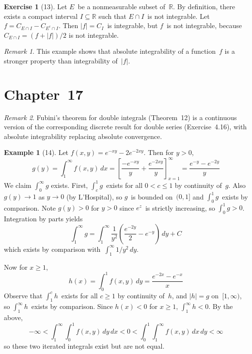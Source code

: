 \documentclass[letterpaper,12pt]{article}
\newcommand{\R}{\mathbb{R}}
\newcommand{\sect}{\cap}
\renewcommand{\d}[1]{\,d\!{#1}}
\newcommand{\dx}{\d{x}}
\newcommand{\dy}{\d{y}}
\newcommand{\abs}[1]{|{#1}|}
\newcommand{\comp}[1]{#1^c}
\theoremstyle{plain}
\theoremstyle{definition}
\newtheorem*{exmp}{Example}
\newtheorem*{exer}{Exercise}
\theoremstyle{remark}
\newtheorem*{rmk}{Remark}
\begin{document}
\begin{exer}[13]
Let \(E\)~be a nonmeasurable subset of~\(\R\). By definition, there exists a compact interval \(I\subseteq\R\) such that \(E\sect I\)~is not integrable. Let \(f=C_{E\sect I}-C_{\comp{E}\sect I}\). Then \(\abs{f}=C_I\)~is integrable, but \(f\)~is not integrable, because \(C_{E\sect I}=(f+\abs{f})/2\) is not integrable.
\end{exer}
\begin{rmk}
This example shows that absolute integrability of a function~\(f\) is a stronger property than integrability of~\(\abs{f}\).
\end{rmk}

\section*{Chapter~17}
\begin{rmk}
Fubini's theorem for double integrals (Theorem~12) is a continuous version of the corresponding discrete result for double series (Exercise~4.16), with absolute integrability replacing absolute convergence.
\end{rmk}

\begin{exmp}[14]
Let \(f(x,y)=e^{-xy}-2e^{-2xy}\). Then for \(y>0\),
\[g(y)=\int_1^{\infty}f(x,y)\dx=\left[\frac{-e^{-xy}}{y}+\frac{e^{-2xy}}{y}\right]_{x=1}^{\infty}=\frac{e^{-y}-e^{-2y}}{y}\]
We claim \(\int_0^{\infty}g\) exists. First, \(\int_c^1 g\)~exists for all \(0<c\le 1\) by continuity of~\(g\). Also \(g(y)\to 1\) as \(y\to 0\) (by L'Hospital), so \(g\)~is bounded on~\((0,1]\) and \(\int_0^1 g\)~exists by comparison. Note \(g(y)>0\) for \(y>0\) since \(e^z\)~is strictly increasing, so \(\int_0^1g>0\). Integration by parts yields
\[\int_1^{\infty}g=\int_1^{\infty}\frac{1}{y^2}\left(\frac{e^{-2y}}{2}-e^{-y}\right)\dy+C\]
which exists by comparison with~\(\int_1^{\infty}1/y^2\dy\).

Now for \(x\ge 1\),
\[h(x)=\int_0^1 f(x,y)\dy=\frac{e^{-2x}-e^{-x}}{x}\]
Observe that \(\int_1^c h\)~exists for all \(c\ge 1\) by continuity of~\(h\), and \(\abs{h}=g\) on~\([1,\infty)\), so \(\int_1^{\infty}h\)~exists by comparison. Since \(h(x)<0\) for \(x\ge 1\), \(\int_1^{\infty}h<0\). By the above,
\[-\infty<\int_1^{\infty}\int_0^1 f(x,y)\dy\dx<0<\int_0^1\int_1^{\infty}f(x,y)\dx\dy<\infty\]
so these two iterated integrals exist but are not equal.
\end{exmp}
\end{document}
